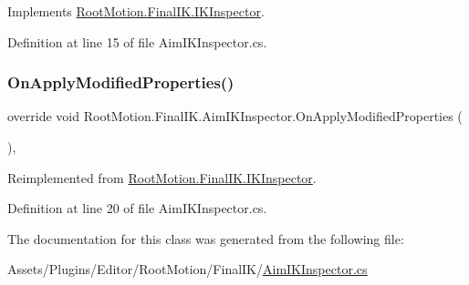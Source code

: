 Implements \mbox{\hyperlink{class_root_motion_1_1_final_i_k_1_1_i_k_inspector_a4c4528d5f5ce9af9e30c049138a5a5ca}{Root\+Motion.\+Final\+I\+K.\+I\+K\+Inspector}}.



Definition at line 15 of file Aim\+I\+K\+Inspector.\+cs.

\mbox{\label{class_root_motion_1_1_final_i_k_1_1_aim_i_k_inspector_a49f6b6386293ca03782ebd2b9394494e}} 
\subsubsection{\texorpdfstring{On\+Apply\+Modified\+Properties()}{OnApplyModifiedProperties()}}
{\footnotesize\ttfamily override void Root\+Motion.\+Final\+I\+K.\+Aim\+I\+K\+Inspector.\+On\+Apply\+Modified\+Properties (\begin{DoxyParamCaption}{ }\end{DoxyParamCaption})\hspace{0.3cm}{\ttfamily [protected]}, {\ttfamily [virtual]}}



Reimplemented from \mbox{\hyperlink{class_root_motion_1_1_final_i_k_1_1_i_k_inspector_a2909376aa17c40b7d7577761165d1c67}{Root\+Motion.\+Final\+I\+K.\+I\+K\+Inspector}}.



Definition at line 20 of file Aim\+I\+K\+Inspector.\+cs.



The documentation for this class was generated from the following file\+:\begin{DoxyCompactItemize}
\item 
Assets/\+Plugins/\+Editor/\+Root\+Motion/\+Final\+I\+K/\mbox{\hyperlink{_aim_i_k_inspector_8cs}{Aim\+I\+K\+Inspector.\+cs}}\end{DoxyCompactItemize}

